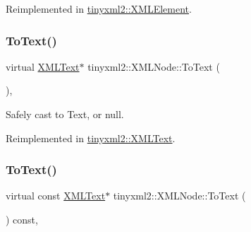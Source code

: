 Reimplemented in \mbox{\hyperlink{classtinyxml2_1_1_x_m_l_element_afeb353047ab8532191709dcaef07337e}{tinyxml2\+::\+X\+M\+L\+Element}}.

\mbox{\label{classtinyxml2_1_1_x_m_l_node_a41c55dab9162d1eb62db2008430e376b}} 
\subsubsection{\texorpdfstring{To\+Text()}{ToText()}\hspace{0.1cm}{\footnotesize\ttfamily [1/2]}}
{\footnotesize\ttfamily virtual \mbox{\hyperlink{classtinyxml2_1_1_x_m_l_text}{X\+M\+L\+Text}}$\ast$ tinyxml2\+::\+X\+M\+L\+Node\+::\+To\+Text (\begin{DoxyParamCaption}{ }\end{DoxyParamCaption})\hspace{0.3cm}{\ttfamily [inline]}, {\ttfamily [virtual]}}



Safely cast to Text, or null. 



Reimplemented in \mbox{\hyperlink{classtinyxml2_1_1_x_m_l_text_ab1213b4ddebe9b17ec7e7040e9f1caf7}{tinyxml2\+::\+X\+M\+L\+Text}}.

\mbox{\label{classtinyxml2_1_1_x_m_l_node_acb9ccc1beda27c0efcb0545683c3e7f4}} 
\subsubsection{\texorpdfstring{To\+Text()}{ToText()}\hspace{0.1cm}{\footnotesize\ttfamily [2/2]}}
{\footnotesize\ttfamily virtual const \mbox{\hyperlink{classtinyxml2_1_1_x_m_l_text}{X\+M\+L\+Text}}$\ast$ tinyxml2\+::\+X\+M\+L\+Node\+::\+To\+Text (\begin{DoxyParamCaption}{ }\end{DoxyParamCaption}) const\hspace{0.3cm}{\ttfamily [inline]}, {\ttfamily [virtual]}}



